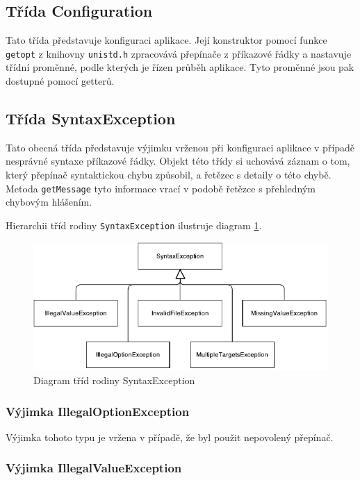 \documentclass[thesis=B,czech,hidelinks]{thesis}[2012/06/26]
\begin{document}
\subsection{Třída Configuration}

Tato třída představuje konfiguraci aplikace. Její konstruktor pomocí funkce \texttt{getopt} z knihovny \texttt{unistd.h} zpracovává přepínače z příkazové řádky a nastavuje třídní proměnné, podle kterých je řízen průběh aplikace. Tyto proměnné jsou pak dostupné pomocí getterů.

\subsection{Třída SyntaxException}

Tato obecná třída představuje výjimku vrženou při konfiguraci aplikace v případě nesprávné syntaxe příkazové řádky. Objekt této třídy si uchovává záznam o tom, který přepínač syntaktickou chybu způsobil, a řetězec s detaily o této chybě. Metoda \texttt{getMessage} tyto informace vrací v podobě řetězce s přehledným chybovým hlášením.

Hierarchii tříd rodiny \texttt{SyntaxException} ilustruje diagram \ref{fig:syntax_exception}.

\begin{figure}
\centering
\caption{Diagram tříd rodiny SyntaxException}
\label{fig:syntax_exception}
\includegraphics[width=\linewidth]{diagrams/syntax_exception}
\end{figure}

\subsubsection{Výjimka IllegalOptionException}

Výjimka tohoto typu je vržena v případě, že byl použit nepovolený přepínač.

\subsubsection{Výjimka IllegalValueException}
\end{document}
